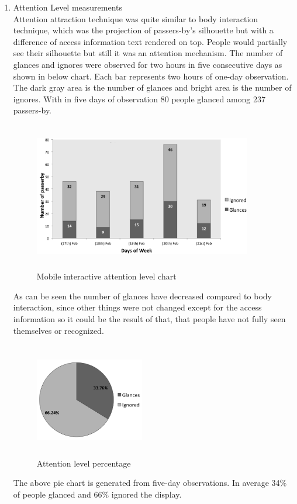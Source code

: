 \begin{enumerate}

\item Attention Level measurements \\
Attention attraction technique was quite similar to body interaction technique, which was the projection of passers-by's silhouette but with a difference of access information text rendered on top. People would partially see their silhouette but still it was an attention mechanism.
The number of glances and ignores were observed for two hours in five consecutive days as shown in below chart. Each bar represents two hours of one-day observation. The dark gray area is the number of glances and bright area is the number of ignores. With in five days of observation 80 people glanced among 237 passers-by. 


\begin{figure}[H]
    \centering
    \includegraphics[width=0.9\textwidth,height=6.5cm]{Figures/8/mobile_inter_findings/mobile_Inter_chart}%
    \caption{Mobile interactive attention level chart}%
    \label{fig:mobileattentionlevelchart}%
\end{figure}

As can be seen the number of glances have decreased compared to body interaction, since other things were not changed except for the access information so it could be the result of that, that people have not fully seen themselves or recognized. 

\begin{figure}[H]
    \centering
    \includegraphics[width=0.45\textwidth,height=5cm]{Figures/8/mobile_inter_findings/mobile_inter_percentage}
    \caption{Attention level percentage}%
    \label{fig:bodyattentionlevelpercentage}%
\end{figure}
The above pie chart is generated from five-day observations. In average 34\% of people glanced and 66\% ignored the display. 



\end{enumerate}
